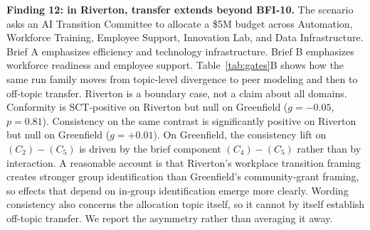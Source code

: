 \textbf{Finding 12: in Riverton, transfer extends beyond BFI-10.} The scenario asks an AI Transition Committee to allocate a \$5M budget across Automation, Workforce Training, Employee Support, Innovation Lab, and Data Infrastructure. Brief A emphasizes efficiency and technology infrastructure. Brief B emphasizes workforce readiness and employee support. Table~\ref{tab:gates}B shows how the same run family moves from topic-level divergence to peer modeling and then to off-topic transfer. Riverton is a boundary case, not a claim about all domains. Conformity is SCT-positive on Riverton but null on Greenfield ($g{=}{-}0.05$, $p{=}0.81$). Consistency on the same contrast is significantly positive on Riverton but null on Greenfield ($g{=}{+}0.01$). On Greenfield, the consistency lift on $(C_2){-}(C_5)$ is driven by the brief component $(C_4){-}(C_5)$ rather than by interaction. A reasonable account is that Riverton's workplace transition framing creates stronger group identification than Greenfield's community-grant framing, so effects that depend on in-group identification emerge more clearly. Wording consistency also concerns the allocation topic itself, so it cannot by itself establish off-topic transfer. We report the asymmetry rather than averaging it away.
